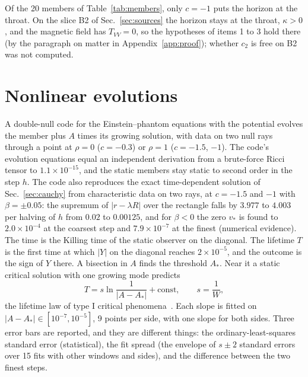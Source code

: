 \documentclass[11pt]{article}
\theoremstyle{plain}
\begin{document}
Of the 20 members of Table~\ref{tab:members}, only $c=-1$ puts the horizon at the throat. On the slice B2 of
Sec.~\ref{sec:sources} the horizon stays at the throat, $\kappa>0$, and the magnetic field has $T_{VV}=0$, so the hypotheses of
items 1 to 3 hold there (by the paragraph on matter in Appendix~\ref{app:proof}); whether $c_2$ is free on B2 was not computed.

\section{Nonlinear evolutions}\label{sec:nonlinear}

A double-null code for the Einstein--phantom equations with the potential evolves the member plus $A$ times its growing
solution, with data on two null rays through a point at $\rho=0$ ($c=-0.3$) or $\rho=1$ ($c=-1.5$, $-1$). The code's
evolution equations equal an independent derivation from a brute-force Ricci tensor to $1.1\times10^{-15}$, and the static
members stay static to second order in the step $h$. The code also reproduces the exact time-dependent solution of
Sec.~\ref{sec:cauchy} from characteristic data on two rays, at $c=-1.5$ and $-1$ with $\beta=\pm0.05$: the supremum of
$|r-\lambda R|$ over the rectangle falls by $3.977$ to $4.003$ per halving of $h$ from $0.02$ to $0.00125$, and for $\beta<0$ the
zero $v_*$ is found to $2.0\times10^{-4}$ at the coarsest step and $7.9\times10^{-7}$ at the finest (numerical evidence). The time is the Killing time of the static observer on the diagonal. The
lifetime $T$ is the first time at which $|Y|$ on the diagonal reaches $2\times10^{-5}$, and the outcome is the sign of $Y$
there. A bisection in $A$ finds the threshold $A_*$. Near it a static critical solution with one growing mode predicts
\begin{equation}
T=s\ln\frac1{|A-A_*|}+\mathrm{const},\qquad s=\frac1W,\label{eq:lifetime}
\end{equation}
the lifetime law of type I critical phenomena~\cite{GMG2007}. Each slope is fitted on $|A-A_*|\in[10^{-7},10^{-5}]$, 9
points per side, with one slope for both sides. Three error bars are reported, and they are different things: the
ordinary-least-squares standard error (statistical), the fit spread (the envelope of $s\pm2$ standard errors over 15 fits
with other windows and sides), and the difference between the two finest steps.
\nopagebreak
\end{document}
